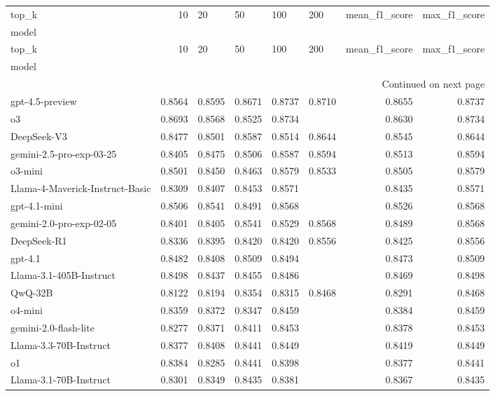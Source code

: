 \begin{longtable}{lrllllrr}
\toprule
top_k & 10 & 20 & 50 & 100 & 200 & mean_f1_score & max_f1_score \\
model &  &  &  &  &  &  &  \\
\midrule
\endfirsthead
\toprule
top_k & 10 & 20 & 50 & 100 & 200 & mean_f1_score & max_f1_score \\
model &  &  &  &  &  &  &  \\
\midrule
\endhead
\midrule
\multicolumn{8}{r}{Continued on next page} \\
\midrule
\endfoot
\bottomrule
\endlastfoot
gpt-4.5-preview & 0.8564 & 0.8595 & 0.8671 & 0.8737 & 0.8710 & 0.8655 & 0.8737 \\
o3 & 0.8693 & 0.8568 & 0.8525 & 0.8734 &  & 0.8630 & 0.8734 \\
DeepSeek-V3 & 0.8477 & 0.8501 & 0.8587 & 0.8514 & 0.8644 & 0.8545 & 0.8644 \\
gemini-2.5-pro-exp-03-25 & 0.8405 & 0.8475 & 0.8506 & 0.8587 & 0.8594 & 0.8513 & 0.8594 \\
o3-mini & 0.8501 & 0.8450 & 0.8463 & 0.8579 & 0.8533 & 0.8505 & 0.8579 \\
Llama-4-Maverick-Instruct-Basic & 0.8309 & 0.8407 & 0.8453 & 0.8571 &  & 0.8435 & 0.8571 \\
gpt-4.1-mini & 0.8506 & 0.8541 & 0.8491 & 0.8568 &  & 0.8526 & 0.8568 \\
gemini-2.0-pro-exp-02-05 & 0.8401 & 0.8405 & 0.8541 & 0.8529 & 0.8568 & 0.8489 & 0.8568 \\
DeepSeek-R1 & 0.8336 & 0.8395 & 0.8420 & 0.8420 & 0.8556 & 0.8425 & 0.8556 \\
gpt-4.1 & 0.8482 & 0.8408 & 0.8509 & 0.8494 &  & 0.8473 & 0.8509 \\
Llama-3.1-405B-Instruct & 0.8498 & 0.8437 & 0.8455 & 0.8486 &  & 0.8469 & 0.8498 \\
QwQ-32B & 0.8122 & 0.8194 & 0.8354 & 0.8315 & 0.8468 & 0.8291 & 0.8468 \\
o4-mini & 0.8359 & 0.8372 & 0.8347 & 0.8459 &  & 0.8384 & 0.8459 \\
gemini-2.0-flash-lite & 0.8277 & 0.8371 & 0.8411 & 0.8453 &  & 0.8378 & 0.8453 \\
Llama-3.3-70B-Instruct & 0.8377 & 0.8408 & 0.8441 & 0.8449 &  & 0.8419 & 0.8449 \\
o1 & 0.8384 & 0.8285 & 0.8441 & 0.8398 &  & 0.8377 & 0.8441 \\
Llama-3.1-70B-Instruct & 0.8301 & 0.8349 & 0.8435 & 0.8381 &  & 0.8367 & 0.8435 \\

\end{longtable}
